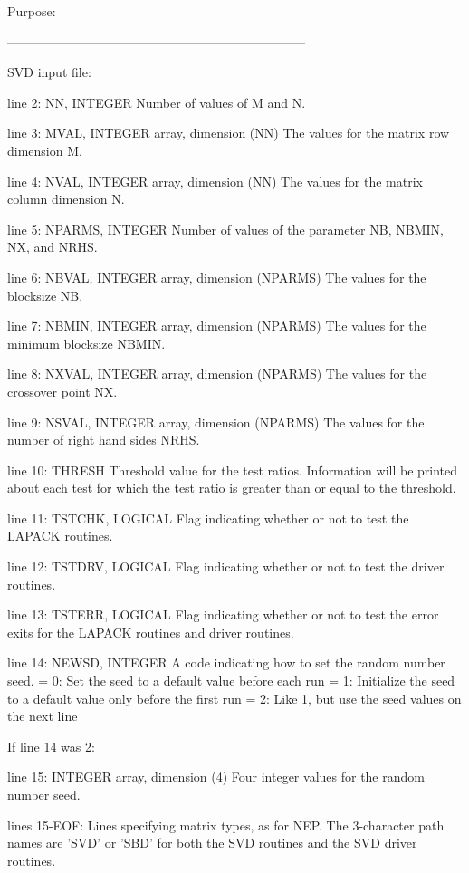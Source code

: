 \begin{DoxyParagraph}{Purpose\+: }
\begin{DoxyVerb}
-----------------------------------------------------------------------

 SVD input file:

 line 2:  NN, INTEGER
          Number of values of M and N.

 line 3:  MVAL, INTEGER array, dimension (NN)
          The values for the matrix row dimension M.

 line 4:  NVAL, INTEGER array, dimension (NN)
          The values for the matrix column dimension N.

 line 5:  NPARMS, INTEGER
          Number of values of the parameter NB, NBMIN, NX, and NRHS.

 line 6:  NBVAL, INTEGER array, dimension (NPARMS)
          The values for the blocksize NB.

 line 7:  NBMIN, INTEGER array, dimension (NPARMS)
          The values for the minimum blocksize NBMIN.

 line 8:  NXVAL, INTEGER array, dimension (NPARMS)
          The values for the crossover point NX.

 line 9:  NSVAL, INTEGER array, dimension (NPARMS)
          The values for the number of right hand sides NRHS.

 line 10: THRESH
          Threshold value for the test ratios.  Information will be
          printed about each test for which the test ratio is greater
          than or equal to the threshold.

 line 11: TSTCHK, LOGICAL
          Flag indicating whether or not to test the LAPACK routines.

 line 12: TSTDRV, LOGICAL
          Flag indicating whether or not to test the driver routines.

 line 13: TSTERR, LOGICAL
          Flag indicating whether or not to test the error exits for
          the LAPACK routines and driver routines.

 line 14: NEWSD, INTEGER
          A code indicating how to set the random number seed.
          = 0:  Set the seed to a default value before each run
          = 1:  Initialize the seed to a default value only before the
                first run
          = 2:  Like 1, but use the seed values on the next line

 If line 14 was 2:

 line 15: INTEGER array, dimension (4)
          Four integer values for the random number seed.

 lines 15-EOF:  Lines specifying matrix types, as for NEP.
          The 3-character path names are 'SVD' or 'SBD' for both the
          SVD routines and the SVD driver routines.


\end{DoxyVerb}
\end{DoxyParagraph}
